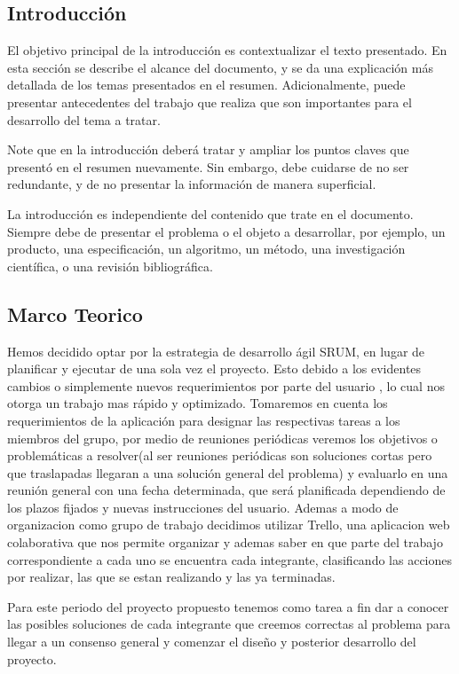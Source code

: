 \documentclass[twocolumn,11pts]{IEEEtran}
\begin{document}
\subsection{Introducción}
El objetivo principal de la introducción es contextualizar el texto presentado. En esta sección se describe el alcance del documento, y se da una explicación más detallada de los temas presentados en el resumen. Adicionalmente, puede presentar antecedentes del trabajo que realiza que son importantes para el desarrollo del tema a tratar.

Note que en la introducción deberá tratar y ampliar los puntos claves que presentó en el resumen nuevamente. Sin embargo, debe cuidarse de no ser redundante, y de no presentar la información de manera superficial.

La introducción es independiente del contenido que trate en el documento. Siempre debe de presentar el problema o el objeto a desarrollar, por ejemplo, un producto, una especificación, un algoritmo, un método, una investigación científica, o una revisión bibliográfica.
\subsection{Marco Teorico}
Hemos decidido optar por la estrategia de desarrollo ágil SRUM, en lugar de planificar y ejecutar de una sola vez el proyecto. Esto debido a los evidentes cambios o simplemente nuevos requerimientos por parte del usuario , lo cual nos otorga un trabajo mas rápido y optimizado.
Tomaremos en cuenta los requerimientos de la aplicación para designar las respectivas tareas a los miembros del grupo, por medio de reuniones periódicas veremos los objetivos o problemáticas a resolver(al ser reuniones periódicas son soluciones cortas pero que traslapadas llegaran a una solución general del problema) y evaluarlo en una  reunión general con una fecha determinada, que será planificada dependiendo de los plazos fijados y nuevas instrucciones del usuario.
Ademas a modo de organizacion como grupo de trabajo decidimos utilizar Trello, una aplicacion web colaborativa que nos permite organizar y ademas saber en que parte del trabajo
correspondiente a cada uno se encuentra cada integrante, clasificando las acciones por realizar, las que se estan realizando y las ya terminadas.

Para este periodo del proyecto propuesto tenemos como tarea a fin dar a conocer las posibles soluciones de cada integrante que creemos correctas al problema para llegar a un consenso general y comenzar el diseño y posterior desarrollo del proyecto.
\end{document}
